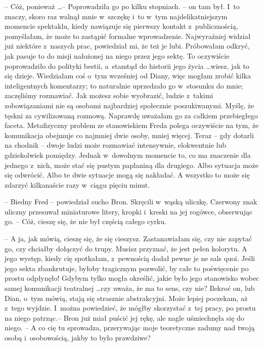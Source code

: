\documentclass[oneside,polish,11pt,rmheadings]{mwbk}
\begin{document}
-- Cóż, ponieważ \ldots  -- Poprowadziła go po kilku stopniach. -- on tam był. I~to znaczy, skoro raz walnął mnie w~szczękę i~to w~tym najdelikatniejszym momencie spektaklu, kiedy nawiązuje się pierwszy kontakt z~publicznością, pomyślałam, że może to zastąpić formalne wprowadzenie. Najwyraźniej widział już niektóre z~naszych prac, powiedział mi, że też je lubi. Próbowałam odkryć, jak pasuje to do misji nałożonej na niego przez jego sektę. To oczywiście poprowadziło do polityki bestii, a~stamtąd do historii jego życia \ldots  wiesz, jak to się dzieje. Wiedziałam coś o~tym wcześniej od Diany, więc mogłam zrobić kilka inteligentnych komentarzy; to naturalnie uprzedzało go w~stosunku do mnie; zaczęliśmy rozmawiać. Jak możesz sobie wyobrazić, ludzie z~takimi zobowiązaniami nie są osobami najbardziej społecznie poszukiwanymi. Myślę, że tęskni za cywilizowaną rozmową. Naprawdę uważałam go za całkiem przebiegłego faceta. Metafizyczny problem ze stanowiskiem Freda polega oczywiście na tym, że komunikacja obejmuje co najmniej dwie osoby, mniej więcej. Teraz -- gdy dotarli na chodnik -- dwoje ludzi może rozmawiać intensywnie, elokwentnie lub gdziekolwiek pomiędzy. Jednak w~dowolnym momencie to, co ma znaczenie dla jednego z~nich, może stać się pustym paplaniną dla drugiego. Albo sytuacja może się odwrócić. Albo te dwie sytuacje mogą się nakładać. A wszystko to może się zdarzyć kilkanaście razy w~ciągu pięciu minut. 

-- Biedny Fred -- powiedział sucho Bron. Skręcili w~wąską uliczkę. Czerwony znak uliczny przesuwał miniaturowe litery, kropki i~kreski na jej rogówce, obserwując go. -- Cóż, cieszę się, że nie był częścią całego cyrku. 

-- A ja, jak mówią, cieszę się, że się cieszysz. Zastanawiałam się, czy nie zapytać go, czy chciałby dołączyć do trupy. Musisz przyznać, że jest pełen kolorytu. A jego występ, kiedy cię spotkałam, z~pewnością dodał pewne je ne sals quoi. Jeśli jego sekta zbankrutuje, byłoby tragicznym pozwolić, by całe to poświęcenie po prostu odpłynęło! Gdybym tylko mogła określić, jakie było jego stanowisko wobec samej komunikacji teatralnej \ldots  czy uważa, że ma to sens, czy nie? Ilekroć on, lub Dian, o~tym mówią, stają się strasznie abstrakcyjni. Może lepiej poczekam, aż z~tego wyjdzie. I~można powiedzieć, że mógłby skorzystać z~tej pracy, po prostu na niego patrząc.-- Bron już miał puścić jej rękę, ale nagle uśmiechnęła się do niego. -- A co cię tu sprowadza, przerywając moje teoretyczne zadumy nad twoją osobą i~osobowością, jakby to było prawdziwe? 
\end{document}
